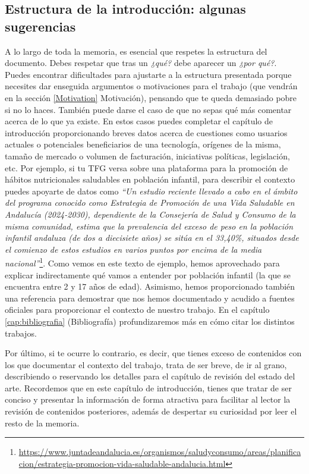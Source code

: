 \subsection{Estructura de la introducción: algunas sugerencias}
A lo largo de toda la memoria, es esencial que respetes la estructura del documento. Debes respetar que tras un \textit{¿qué?} debe aparecer un \textit{¿por qué?}.
Puedes encontrar dificultades para ajustarte a la estructura presentada porque necesites dar enseguida argumentos o motivaciones para el trabajo (que vendrán en la sección \ref{Motivation} Motivación), pensando que te queda demasiado pobre si no lo haces. También puede darse el caso de que no sepas qué más comentar acerca de lo que ya existe. En estos casos puedes completar el capítulo de introducción proporcionando breves datos acerca de cuestiones como usuarios actuales o potenciales beneficiarios de una tecnología, orígenes de la misma, tamaño de mercado o volumen de facturación, iniciativas políticas, legislación, etc. Por ejemplo, si tu TFG versa sobre una plataforma para la promoción de hábitos nutricionales saludables en población infantil, para describir el contexto puedes apoyarte de datos como \textit{``Un estudio reciente llevado a cabo en el ámbito del programa conocido como Estrategia de Promoción de una Vida Saludable en Andalucía (2024-2030), dependiente de la Consejería de Salud y Consumo de la misma comunidad, estima que la prevalencia del exceso de peso en la población infantil andaluza (de dos a diecisiete años)  se sitúa en el 33,40\%, situados desde el comienzo de estos estudios en varios puntos por encima de la media nacional''}\footnote{\url{https://www.juntadeandalucia.es/organismos/saludyconsumo/areas/planificacion/estrategia-promocion-vida-saludable-andalucia.html}}. Como vemos en este texto de ejemplo, hemos aprovechado para explicar indirectamente qué vamos a entender por población infantil (la que se encuentra entre 2 y 17 años de edad). Asimismo, hemos proporcionado también una referencia para demostrar que nos hemos documentado y acudido a fuentes oficiales para proporcionar el contexto de nuestro trabajo. En el capítulo  \ref{cap:bibliografia} (Bibliografía) profundizaremos más en cómo citar los distintos trabajos.

Por último, si te ocurre lo contrario, es decir, que tienes exceso de contenidos con los que documentar el contexto del trabajo, trata de ser breve, de ir al grano, describiendo o reservando los detalles para el capítulo de revisión del estado del arte. Recordemos que en este capítulo de introducción,  tienes que tratar de ser conciso y presentar la información de forma atractiva para facilitar al lector la revisión de contenidos posteriores, además de despertar su curiosidad por leer el resto de la memoria.

